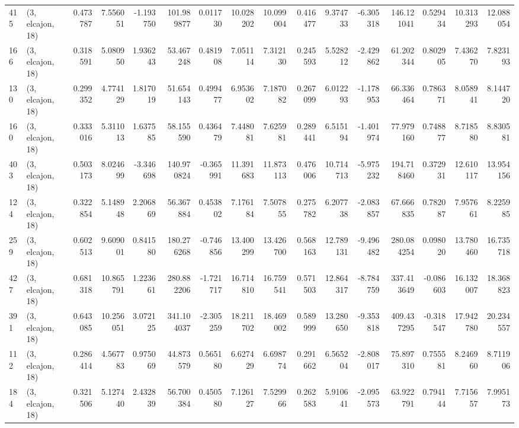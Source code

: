 \begin{tabular}{llrrrrrrrrrrrrrr}
415 &  (3, elcajon, 18) &   0.473787 &   7.556051 &  -1.193750 &   101.989877 &   0.011730 &  10.028202 &  10.099004 &  0.416477 &   9.374733 &  -6.305318 &   146.121041 &  0.529434 &  10.313293 &  12.088054 \\
166 &  (3, elcajon, 18) &   0.318591 &   5.080950 &   1.936243 &    53.467248 &   0.481908 &   7.051114 &   7.312130 &  0.245593 &   5.528212 &  -2.429862 &    61.202344 &  0.802905 &   7.436270 &   7.823193 \\
130 &  (3, elcajon, 18) &   0.299352 &   4.774129 &   1.817019 &    51.654143 &   0.499477 &   6.953602 &   7.187082 &  0.267099 &   6.012293 &  -1.178953 &    66.336464 &  0.786371 &   8.058941 &   8.144720 \\
160 &  (3, elcajon, 18) &   0.333016 &   5.311013 &   1.637585 &    58.155590 &   0.436479 &   7.448081 &   7.625981 &  0.289441 &   6.515194 &  -1.401974 &    77.979160 &  0.748877 &   8.718580 &   8.830581 \\
403 &  (3, elcajon, 18) &   0.503173 &   8.024699 &  -3.346698 &   140.970824 &  -0.365991 &  11.391683 &  11.873113 &  0.476006 &  10.714713 &  -5.975232 &   194.718460 &  0.372931 &  12.610117 &  13.954156 \\
124 &  (3, elcajon, 18) &   0.322854 &   5.148948 &   2.206869 &    56.367884 &   0.453802 &   7.176184 &   7.507855 &  0.275782 &   6.207738 &  -2.083857 &    67.666835 &  0.782087 &   7.957661 &   8.225985 \\
259 &  (3, elcajon, 18) &   0.602513 &   9.609001 &   0.841580 &   180.276268 &  -0.746856 &  13.400299 &  13.426700 &  0.568163 &  12.789131 &  -9.496482 &   280.084254 &  0.098020 &  13.780460 &  16.735718 \\
427 &  (3, elcajon, 18) &   0.681318 &  10.865791 &   1.223661 &   280.882206 &  -1.721717 &  16.714810 &  16.759541 &  0.571503 &  12.864317 &  -8.784759 &   337.413649 & -0.086603 &  16.132007 &  18.368823 \\
391 &  (3, elcajon, 18) &   0.643085 &  10.256051 &   3.072125 &   341.104037 &  -2.305259 &  18.211702 &  18.469002 &  0.589999 &  13.280650 &  -9.353818 &   409.437295 & -0.318547 &  17.942780 &  20.234557 \\
112 &  (3, elcajon, 18) &   0.286414 &   4.567783 &   0.975069 &    44.873579 &   0.565180 &   6.627429 &   6.698774 &  0.291662 &   6.565204 &  -2.808017 &    75.897310 &  0.755581 &   8.246960 &   8.711906 \\
184 &  (3, elcajon, 18) &   0.321506 &   5.127440 &   2.432839 &    56.700384 &   0.450580 &   7.126127 &   7.529966 &  0.262583 &   5.910641 &  -2.095573 &    63.922791 &  0.794144 &   7.715657 &   7.995173 \\

\end{tabular}
